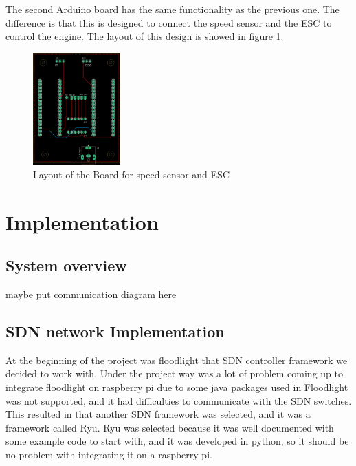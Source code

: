 \documentclass[11pt, titlepage]{article} %
\begin{document}
The second Arduino board has the same functionality as the previous one. The difference is that this is designed to connect the speed sensor and the ESC to control the engine. The layout of this design is showed in figure \ref{fig:board_layout_ir_esc}.

\begin{figure}
	\includegraphics[width=0.3\textwidth]{borad_layout_ir_esc.png}
	\caption{Layout of the Board for speed sensor and ESC}
	\label{fig:board_layout_ir_esc}
\end{figure}


\clearpage
\section{Implementation}

\subsection{System overview}
maybe put communication diagram here

\subsection{SDN network Implementation}

At the beginning of the project was floodlight that SDN controller framework we decided to work with. Under the project way was a lot of problem coming up to integrate floodlight on raspberry pi due to some java packages used in Floodlight was not supported, and it had difficulties to communicate with the SDN switches. This resulted in that another SDN framework was selected, and it was a framework called Ryu. Ryu was selected because it was well documented with some example code to start with, and it was developed in python, so it should be no problem with integrating it on a raspberry pi. 
\end{document}
